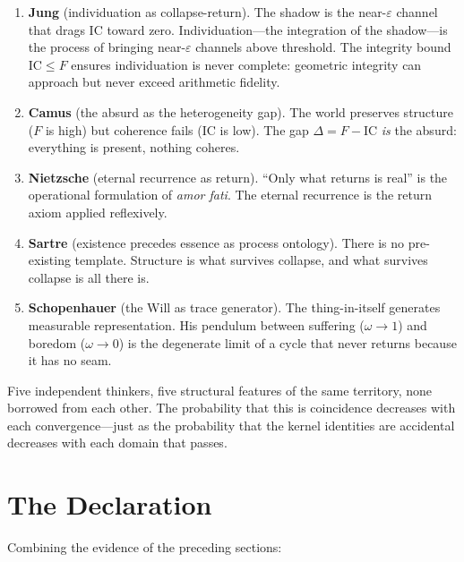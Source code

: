 \documentclass[
  aps,
  prd,
  twocolumn,
  superscriptaddress,
  nofootinbib,
  floatfix
]{revtex4-2}
\newcommand{\eps}{\varepsilon}
\newcommand{\IC}{\mathrm{IC}}
\begin{document}
\begin{enumerate}[leftmargin=*,label=(\roman*)]
\item \textbf{Jung} (individuation as collapse-return).  The shadow
  is the near-$\eps$ channel that drags $\IC$ toward zero.
  Individuation---the integration of the shadow---is the process of
  bringing near-$\eps$ channels above threshold.  The integrity bound
  $\IC \leq F$ ensures individuation is never complete: geometric
  integrity can approach but never exceed arithmetic fidelity.

\item \textbf{Camus} (the absurd as the heterogeneity gap).  The
  world preserves structure ($F$ is high) but coherence fails ($\IC$
  is low).  The gap $\Delta = F - \IC$ \emph{is} the absurd:
  everything is present, nothing coheres.

\item \textbf{Nietzsche} (eternal recurrence as return).  ``Only
  what returns is real'' is the operational formulation of \emph{amor
  fati}.  The eternal recurrence is the return axiom applied
  reflexively.

\item \textbf{Sartre} (existence precedes essence as process
  ontology).  There is no pre-existing template.  Structure is what
  survives collapse, and what survives collapse is all there is.

\item \textbf{Schopenhauer} (the Will as trace generator).  The
  thing-in-itself generates measurable representation.  His pendulum
  between suffering ($\omega \to 1$) and boredom ($\omega \to 0$) is
  the degenerate limit of a cycle that never returns because it has
  no seam.
\end{enumerate}

\noindent Five independent thinkers, five structural features of the
same territory, none borrowed from each other.  The probability that
this is coincidence decreases with each convergence---just as the
probability that the kernel identities are accidental decreases with
each domain that passes.

\section{The Declaration}\label{sec:declaration}

Combining the evidence of the preceding sections:
\end{document}
